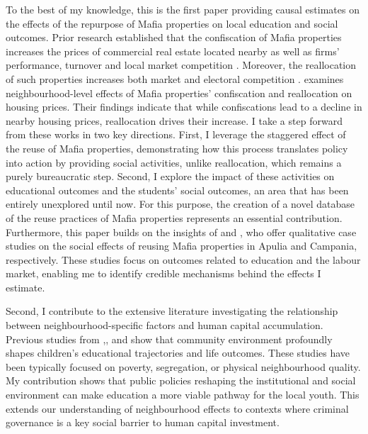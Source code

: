 \documentclass[12pt]{article}
\theoremstyle{plain}
\theoremstyle{plain}
\theoremstyle{plain}
\theoremstyle{definition}
\theoremstyle{plain}
\theoremstyle{definition}
\theoremstyle{plain}
\theoremstyle{remark}
\theoremstyle{definition}
\theoremstyle{definition}
\theoremstyle{plain}
\begin{document}
To the best of my knowledge, this is the first paper providing causal estimates on the effects of the repurpose of Mafia properties on local education and social outcomes. Prior research established that the confiscation of Mafia properties increases the prices of commercial real estate located nearby as well as firms' performance, turnover and local market competition \citep{calamunci_closed_2022, calamunci_economic_2020, ferrante_mafia_2021, operti_tough_2018}. Moreover, the reallocation of such properties increases both market and electoral competition \citep{ferrante_mafia_2021, ferrante_shall_2021}.  \citet{boeri_localized_2023}  examines neighbourhood-level effects of Mafia properties' confiscation and reallocation on housing prices. Their findings indicate that while confiscations lead to a decline in nearby housing prices, reallocation drives their increase. I take a step forward from these works in two key directions. First, I leverage the staggered effect of the reuse of Mafia properties, demonstrating how this process translates policy into action by providing social activities, unlike reallocation, which remains a purely bureaucratic step. Second, I explore the impact of these activities on educational outcomes and the students' social outcomes, an area that has been entirely unexplored until now. For this purpose, the creation of a novel database of the reuse practices of Mafia properties represents an essential contribution. Furthermore, this paper builds on the insights of \citet{nazzaro_il_2021} and \citet{martone_politiche_2020}, who offer qualitative case studies on the social effects of reusing Mafia properties in Apulia and Campania, respectively. These studies focus on outcomes related to education and the labour market, enabling me to identify credible mechanisms behind the effects I estimate.\par 
Second, I contribute to the extensive literature investigating the relationship between neighbourhood-specific factors and human capital accumulation. Previous studies from \citet{ludwig_long-term_2013},\citep{chetty_impacts_2018}, and \citep{bergman_creating_2024} show that community environment profoundly shapes children's educational trajectories and life outcomes. These studies have been typically focused on poverty, segregation, or physical neighbourhood quality. My contribution shows that public policies reshaping the institutional and social environment can make education a more viable pathway for the local youth. This extends our understanding of neighbourhood effects to contexts where criminal governance is a key social barrier to human capital investment. \par
\end{document}
